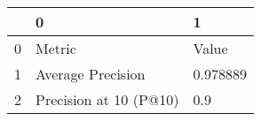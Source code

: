 \begin{tabular}{lll}
\toprule
{} &                       0 &         1 \\
\midrule
0 &                  Metric &     Value \\
1 &       Average Precision &  0.978889 \\
2 &  Precision at 10 (P@10) &       0.9 \\
\bottomrule
\end{tabular}
